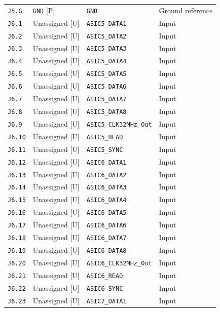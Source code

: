 \documentclass[11pt,a4paper]{article}
\begin{document}
\begin{longtable}{@{}P{21mm}P{34mm}P{78mm}P{33mm}@{}}
\nolinkurl{J5.G} & \nolinkurl{GND} [P] & \nolinkurl{GND} & Ground reference \\
\nolinkurl{J6.1} & Unassigned [U] & \nolinkurl{ASIC5_DATA1} & Input \\
\nolinkurl{J6.2} & Unassigned [U] & \nolinkurl{ASIC5_DATA2} & Input \\
\nolinkurl{J6.3} & Unassigned [U] & \nolinkurl{ASIC5_DATA3} & Input \\
\nolinkurl{J6.4} & Unassigned [U] & \nolinkurl{ASIC5_DATA4} & Input \\
\nolinkurl{J6.5} & Unassigned [U] & \nolinkurl{ASIC5_DATA5} & Input \\
\nolinkurl{J6.6} & Unassigned [U] & \nolinkurl{ASIC5_DATA6} & Input \\
\nolinkurl{J6.7} & Unassigned [U] & \nolinkurl{ASIC5_DATA7} & Input \\
\nolinkurl{J6.8} & Unassigned [U] & \nolinkurl{ASIC5_DATA8} & Input \\
\nolinkurl{J6.9} & Unassigned [U] & \nolinkurl{ASIC5_CLK32MHz_Out} & Input \\
\nolinkurl{J6.10} & Unassigned [U] & \nolinkurl{ASIC5_READ} & Input \\
\nolinkurl{J6.11} & Unassigned [U] & \nolinkurl{ASIC5_SYNC} & Input \\
\nolinkurl{J6.12} & Unassigned [U] & \nolinkurl{ASIC6_DATA1} & Input \\
\nolinkurl{J6.13} & Unassigned [U] & \nolinkurl{ASIC6_DATA2} & Input \\
\nolinkurl{J6.14} & Unassigned [U] & \nolinkurl{ASIC6_DATA3} & Input \\
\nolinkurl{J6.15} & Unassigned [U] & \nolinkurl{ASIC6_DATA4} & Input \\
\nolinkurl{J6.16} & Unassigned [U] & \nolinkurl{ASIC6_DATA5} & Input \\
\nolinkurl{J6.17} & Unassigned [U] & \nolinkurl{ASIC6_DATA6} & Input \\
\nolinkurl{J6.18} & Unassigned [U] & \nolinkurl{ASIC6_DATA7} & Input \\
\nolinkurl{J6.19} & Unassigned [U] & \nolinkurl{ASIC6_DATA8} & Input \\
\nolinkurl{J6.20} & Unassigned [U] & \nolinkurl{ASIC6_CLK32MHz_Out} & Input \\
\nolinkurl{J6.21} & Unassigned [U] & \nolinkurl{ASIC6_READ} & Input \\
\nolinkurl{J6.22} & Unassigned [U] & \nolinkurl{ASIC6_SYNC} & Input \\
\nolinkurl{J6.23} & Unassigned [U] & \nolinkurl{ASIC7_DATA1} & Input \\

\end{longtable}
\end{document}
